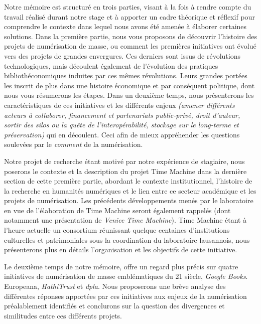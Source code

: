 Notre mémoire est structuré en trois parties, visant à la fois à rendre compte du travail réalisé durant notre stage et à apporter un cadre théorique et réflexif pour comprendre le contexte dans lequel nous avons été amenée à élaborer certaines solutions. Dans la première partie, nous vous proposons de découvrir l'histoire des projets de numérisation de masse, ou comment les premières initiatives ont évolué vers des projets de grandes envergures. Ces derniers sont issus de révolutions technologiques, mais découlent également de l'évolution des pratiques bibliothéconomiques induites par ces mêmes révolutions. Leurs grandes portées les inscrit de plus dans une histoire économique et par conséquent politique, dont nous vous résumerons les étapes. Dans un deuxième temps, nous présenterons les caractéristiques de ces initiatives et les différents enjeux \textit{(amener différents acteurs à collaborer, financement et partenariats public-privé, droit d'auteur, sortir des silos ou la quête de l'interopérabilité, stockage sur le long-terme et préservation)} qui en découlent. Ceci afin de mieux appréhender les questions soulevées par le \textit{comment} de la numérisation.

Notre projet de recherche étant motivé par notre expérience de stagiaire, nous poserons le contexte et la description du projet Time Machine dans la dernière section de cette première partie, abordant le contexte institutionnel, l'histoire de la recherche en humanités numériques et le lien entre ce secteur académique et les projets de numérisation. Les précédents développements menés par le laboratoire en vue de l'élaboration de Time Machine seront également rappelés (dont notamment une présentation de \textit{Venice Time Machine}). Time Machine étant à l'heure actuelle un consortium réunissant quelque centaines d'institutions culturelles et patrimoniales sous la coordination du laboratoire lausannois, nous présenterons plus en détails l'organisation et les objectifs de cette initiative. 

Le deuxième temps de notre mémoire, offre un regard plus précis sur quatre initiatives de numérisation de masse emblématiques du 21 siècle, \textit{Google Books}. Europeana, \textit{HathiTrust} et \textit{\gls{dpla}}. Nous proposerons une brève analyse des différentes réponses apportées par ces initiatives aux enjeux de la numérisation préalablement identifiés et conclurons sur la question des divergences et similitudes entre ces différents projets.

